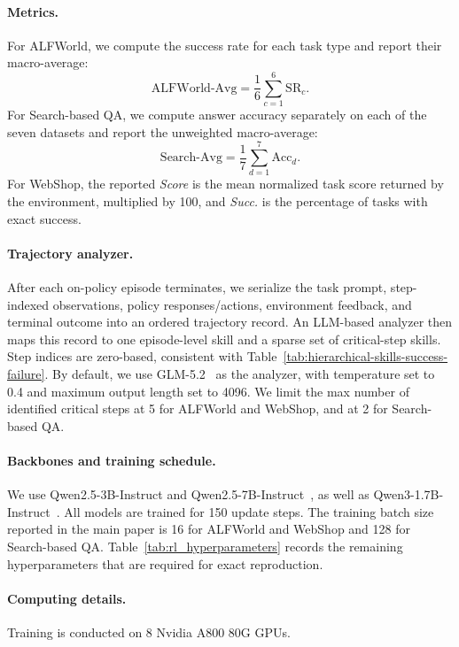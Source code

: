 \paragraph{Metrics.}
For ALFWorld, we compute the success rate for each task type and report their macro-average:
\begin{equation}
    \mathrm{ALFWorld\text{-}Avg}
    = \frac{1}{6}\sum_{c=1}^{6}\mathrm{SR}_{c}.
\end{equation}
For Search-based QA, we compute answer accuracy separately on each of the seven datasets and report the unweighted macro-average:
\begin{equation}
    \mathrm{Search\text{-}Avg}
    = \frac{1}{7}\sum_{d=1}^{7}\mathrm{Acc}_{d}.
\end{equation}
For WebShop, the reported \textit{Score} is the mean normalized task score returned by the environment, multiplied by 100, and \textit{Succ.} is the percentage of tasks with exact success. 

\paragraph{Trajectory analyzer.}
After each on-policy episode terminates, we serialize the task prompt, step-indexed observations, policy responses/actions, environment feedback, and terminal outcome into an ordered trajectory record. An LLM-based analyzer then maps this record to one episode-level skill and a sparse set of critical-step skills. Step indices are zero-based, consistent with Table~\ref{tab:hierarchical-skills-success-failure}. By default, we use GLM-5.2~\citep{zai2026glm52} as the analyzer, with temperature set to 0.4 and maximum output length set to 4096. We limit the max number of identified critical steps at 5 for ALFWorld and WebShop, and at 2 for Search-based QA.

\paragraph{Backbones and training schedule.}
We use Qwen2.5-3B-Instruct and Qwen2.5-7B-Instruct~\citep{yang2024qwen25}, as well as Qwen3-1.7B-Instruct~\citep{yang2025qwen3}. All models are trained for 150 update steps. The training batch size reported in the main paper is 16 for ALFWorld and WebShop and 128 for Search-based QA. Table~\ref{tab:rl_hyperparameters} records the remaining hyperparameters that are required for exact reproduction.

 

\paragraph{Computing details.}
Training is conducted on 8 Nvidia A800 80G GPUs.


